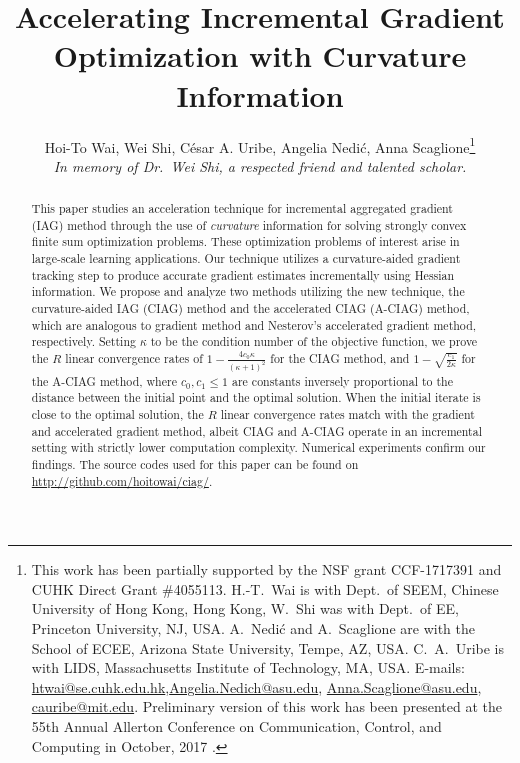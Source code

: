 \documentclass[smallextended]{svjour3}       %
\title{Accelerating Incremental Gradient Optimization with Curvature Information}
\author{Hoi-To Wai, Wei Shi, C\'{e}sar A. Uribe, Angelia Nedi\'{c}, Anna Scaglione\thanks{This work has been partially supported by the NSF grant
CCF-1717391 and CUHK Direct Grant \#4055113. H.-T.~Wai is with Dept.~of SEEM, Chinese University of Hong Kong, Hong Kong, W.~Shi was with Dept.~of EE, Princeton University, NJ, USA. A.~Nedi\'{c} and A.~Scaglione are with the School of ECEE, Arizona State University, Tempe, AZ, USA. C.~A.~Uribe is with LIDS, Massachusetts Institute of Technology, MA, USA. E-mails: \url{htwai@se.cuhk.edu.hk},\url{Angelia.Nedich@asu.edu}, \url{Anna.Scaglione@asu.edu}, \url{cauribe@mit.edu}.
Preliminary version of this work has been presented at the 55th Annual Allerton Conference on Communication, Control, and Computing in October, 2017 \cite{wai2017curvature}.}\\[.5cm]
\emph{In memory of Dr.~Wei Shi, a respected friend and talented scholar.}
}
\begin{document}
\maketitle

\begin{abstract}
This paper studies an acceleration technique for incremental aggregated gradient 
({\sf IAG}) method through the use of \emph{curvature} information for 
solving strongly convex finite sum optimization problems. 
These optimization problems of interest arise in large-scale learning applications. 
Our technique utilizes a curvature-aided gradient tracking
step to produce accurate gradient estimates incrementally using Hessian information. 
We propose and analyze two methods utilizing the new technique,
the curvature-aided IAG ({\sf CIAG}) method and the accelerated CIAG ({\sf A-CIAG}) method, 
which are analogous to gradient method and Nesterov's accelerated gradient method, respectively.
Setting $\kappa$ to be the condition number of the objective function, we prove the $R$ linear convergence rates of $1 - \frac{4c_0 \kappa}{(\kappa+1)^2}$ for the {\sf CIAG} method, and $1 - \sqrt{\frac{c_1}{2\kappa}}$ for the {\sf A-CIAG} method, where $c_0,c_1 \leq 1$ are constants inversely proportional to the distance between the initial point and the optimal solution. When the initial iterate is close to the optimal solution, the $R$ linear convergence rates match with the gradient and accelerated gradient method, albeit {\sf CIAG} and {\sf A-CIAG} operate in an incremental setting with strictly lower computation complexity.
Numerical experiments confirm our findings.
The source codes used for this paper can be found on \url{http://github.com/hoitowai/ciag/}.
\end{abstract}


%
\end{document}
